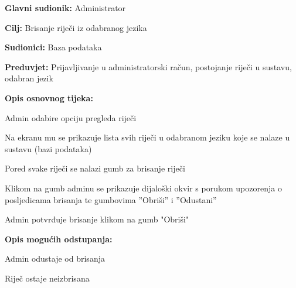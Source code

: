 \noindent {}
\begin{packed_item}

	\item \textbf{Glavni sudionik: } Administrator
	\item \textbf{Cilj: } Brisanje riječi iz odabranog jezika
	\item \textbf{Sudionici: } Baza podataka
	\item \textbf{Preduvjet: } Prijavljivanje u administratorski račun, postojanje riječi u sustavu, odabran jezik
	\item  \textbf{Opis osnovnog tijeka:}
	
	\item[] \begin{packed_enum}
		
		\item Admin odabire opciju pregleda riječi
		\item Na ekranu mu se prikazuje lista svih riječi u odabranom jeziku koje se nalaze u sustavu (bazi podataka)
		\item Pored svake riječi se nalazi gumb za brisanje riječi
		\item Klikom na gumb adminu se prikazuje dijaloški okvir s porukom upozorenja o posljedicama brisanja te gumbovima ”Obriši” i ”Odustani”
		\item Admin potvrđuje brisanje klikom na gumb "Obriši"

	\end{packed_enum}

	\item  \textbf{Opis mogućih odstupanja:}
	
	\item[] \begin{packed_item}

		\item[5.a] Admin odustaje od brisanja
		\item[] \begin{packed_enum}
			
			\item Riječ ostaje neizbrisana
			
		\end{packed_enum}
		
	\end{packed_item}
	
\end{packed_item}



